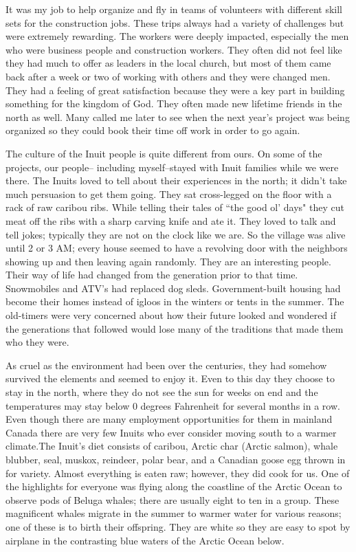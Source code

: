 \documentclass[oneside,12pt]{book}
\begin{document}
It was my job to help organize and fly in teams of volunteers with different skill sets for the construction jobs. These trips always had a variety of challenges but were extremely rewarding. The workers were deeply impacted, especially the men who were business people and construction workers. They often did not feel like they had much to offer as leaders in the local church, but most of them came back after a week or two of working with others and they were changed men. They had a feeling of great satisfaction because they were a key part in building something for the kingdom of God. They often made new lifetime friends in the north as well. Many called me later to see when the next year's project was being organized so they could book their time off work in order to go again.

The culture of the Inuit people is quite different from ours. On some of the projects, our people-- including myself--stayed with Inuit families while we were there. The Inuits loved to tell about their experiences in the north; it didn't take much persuasion to get them going. They sat cross-legged on the floor with a rack of raw caribou ribs. While telling their tales of ``the good ol' days" they cut meat off the ribs with a sharp carving knife and ate it. They loved to talk and tell jokes; typically they are not on the clock like we are. So the village was alive until 2 or 3 AM; every house seemed to have a revolving door with the neighbors showing up and then leaving again randomly. They are an interesting people. Their way of life had changed from the generation prior to that time. Snowmobiles and ATV's had replaced dog sleds. Government-built housing had become their homes instead of igloos in the winters or tents in the summer. The old-timers were very concerned about how their future looked and wondered if the generations that followed would lose many of the traditions that made them who they were. 

As cruel as the environment had been over the centuries, they had somehow survived the elements and seemed to enjoy it. Even to this day they choose to stay in the north, where they do not see the sun for weeks on end and the temperatures may stay below 0 degrees Fahrenheit for several months in a row. Even though there are many employment opportunities for them in mainland Canada there are very few Inuits who ever consider moving south to a warmer climate.The Inuit's diet consists of caribou, Arctic char (Arctic salmon), whale blubber, seal, muskox, reindeer, polar bear, and a Canadian goose egg thrown in for variety. Almost everything is eaten raw; however, they did cook for us. One of the highlights for everyone was flying along the coastline of the Arctic Ocean to observe pods of Beluga whales; there are usually eight to ten in a group. These magnificent whales migrate in the summer to warmer water for various reasons; one of these is to birth their offspring. They are white so they are easy to spot by airplane in the contrasting blue waters of the Arctic Ocean below.
\end{document}
